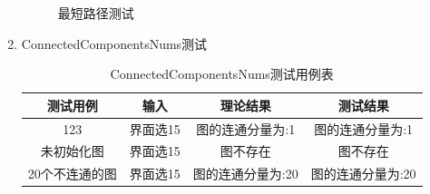 \documentclass[supercite]{HustGraduPaper}
\theoremstyle{definition}
\begin{document}
\begin{enumerate}
\begin{figure}[htb]
		      \caption{最短路径测试}
	      \end{figure}
	      \newpage
	\item ConnectedComponentsNums测试
	      \begin{table}[htb]
		      \begin{center}
			      \setlength{\tabcolsep}{2.0mm}
			      \caption{ConnectedComponentsNums测试用例表}
			      \label{t15}
			      \begin{tabular}{|c|c|c|c|}
				      \hline
				      测试用例       & 输入     & 理论结果          & 测试结果          \\
				      \hline
				      \hline
				      123            & 界面选15 & 图的连通分量为:1  & 图的连通分量为:1  \\
				      \hline
				      未初始化图     & 界面选15 & 图不存在          & 图不存在          \\
				      \hline
				      20个不连通的图 & 界面选15 & 图的连通分量为:20 & 图的连通分量为:20 \\
				      \hline
			      \end{tabular}
		      \end{center}
	      \end{table}
	      \begin{figure}[htb]
		      \centering
		      \quad
		      \quad
		      \\

\end{figure}
\end{enumerate}
\end{document}

